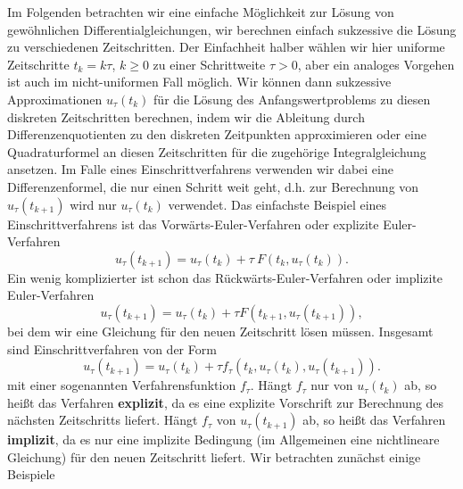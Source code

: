 Im Folgenden betrachten wir eine einfache Möglichkeit zur Lösung von gewöhnlichen Differentialgleichungen, wir berechnen einfach sukzessive die Lösung zu verschiedenen Zeitschritten. Der Einfachheit halber wählen wir hier uniforme Zeitschritte $t_k = k \tau$, $k \geq 0$ zu einer Schrittweite $\tau>0$, aber ein analoges Vorgehen ist auch im nicht-uniformen Fall möglich. Wir können dann sukzessive Approximationen $u_\tau(t_k)$ für die Lösung des Anfangswertproblems zu diesen diskreten Zeitschritten berechnen, indem wir die Ableitung durch Differenzenquotienten zu den diskreten Zeitpunkten approximieren oder eine Quadraturformel an diesen Zeitschritten für die zugehörige Integralgleichung ansetzen. Im Falle eines Einschrittverfahrens verwenden wir dabei eine Differenzenformel, die nur einen Schritt weit geht, d.h. zur Berechnung von $u_\tau(t_{k+1})$ wird nur $u_\tau(t_k)$ verwendet. 
%
Das einfachste Beispiel eines Einschrittverfahrens ist das Vorwärts-Euler-Verfahren oder explizite Euler-Verfahren
%
\begin{equation}
u_\tau(t_{k+1}) = u_\tau(t_k) + \tau\ F(t_k,u_\tau(t_k)).
\end{equation}
%
Ein wenig komplizierter ist schon das Rückwärts-Euler-Verfahren oder implizite Euler-Verfahren
%
\begin{equation}
u_\tau(t_{k+1}) = u_\tau(t_k) + \tau F(t_{k+1},u_\tau(t_{k+1})), 
\end{equation}
%
bei dem wir eine Gleichung für den neuen Zeitschritt lösen müssen. Insgesamt sind Einschrittverfahren von der Form
\begin{equation}
u_\tau(t_{k+1}) = u_\tau(t_k) + \tau f_\tau(t_{k},u_\tau(t_{k}),u_\tau(t_{k+1})). 
\end{equation}
%
mit einer sogenannten Verfahrensfunktion $f_\tau$.
%
Hängt $f_\tau$ nur von $u_\tau(t_k)$ ab, so heißt das Verfahren \textbf{explizit}, da es eine explizite Vorschrift zur Berechnung des nächsten Zeitschritts liefert. Hängt $f_\tau$  von $u_\tau(t_{k+1})$ ab, so heißt das Verfahren \textbf{implizit}, da es nur eine implizite Bedingung (im Allgemeinen eine nichtlineare Gleichung) für den neuen Zeitschritt liefert. Wir betrachten zunächst einige Beispiele
%
